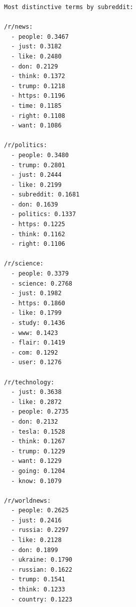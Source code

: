 \documentclass[
  12pt,
  letterpaper,
  DIV=11,
  numbers=noendperiod]{scrartcl}
\begin{document}
\begin{verbatim}
Most distinctive terms by subreddit:

/r/news:
  - people: 0.3467
  - just: 0.3182
  - like: 0.2480
  - don: 0.2129
  - think: 0.1372
  - trump: 0.1218
  - https: 0.1196
  - time: 0.1185
  - right: 0.1108
  - want: 0.1086

/r/politics:
  - people: 0.3480
  - trump: 0.2801
  - just: 0.2444
  - like: 0.2199
  - subreddit: 0.1681
  - don: 0.1639
  - politics: 0.1337
  - https: 0.1225
  - think: 0.1162
  - right: 0.1106

/r/science:
  - people: 0.3379
  - science: 0.2768
  - just: 0.1982
  - https: 0.1860
  - like: 0.1799
  - study: 0.1436
  - www: 0.1423
  - flair: 0.1419
  - com: 0.1292
  - user: 0.1276

/r/technology:
  - just: 0.3638
  - like: 0.2872
  - people: 0.2735
  - don: 0.2132
  - tesla: 0.1528
  - think: 0.1267
  - trump: 0.1229
  - want: 0.1229
  - going: 0.1204
  - know: 0.1079

/r/worldnews:
  - people: 0.2625
  - just: 0.2416
  - russia: 0.2297
  - like: 0.2128
  - don: 0.1899
  - ukraine: 0.1790
  - russian: 0.1622
  - trump: 0.1541
  - think: 0.1233
  - country: 0.1223
\end{verbatim}
\end{document}
